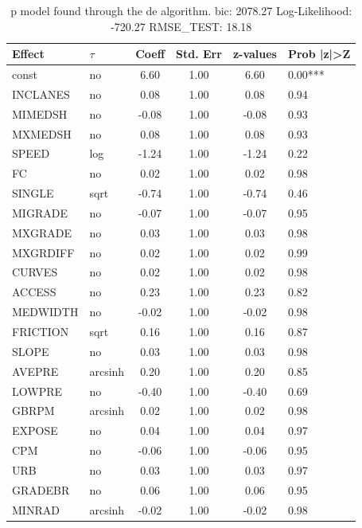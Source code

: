 \begin{table}
	\caption{p model found through the de algorithm. bic: 2078.27 Log-Likelihood: -720.27 RMSE_TEST: 18.18}
	\begin{center}
		\begin{tabular}{|l|l|c|c|c|l|}
			\hline
			Effect & $\tau$ & Coeff & Std. Err & z-values & Prob |z|>Z \\
			\hline
			const & no & 6.60 & 1.00 & 6.60 & 0.00*** \\
			\hline
			INCLANES & no & 0.08 & 1.00 & 0.08 & 0.94 \\
			\hline
			MIMEDSH & no & -0.08 & 1.00 & -0.08 & 0.93 \\
			\hline
			MXMEDSH & no & 0.08 & 1.00 & 0.08 & 0.93 \\
			\hline
			SPEED & log & -1.24 & 1.00 & -1.24 & 0.22 \\
			\hline
			FC & no & 0.02 & 1.00 & 0.02 & 0.98 \\
			\hline
			SINGLE & sqrt & -0.74 & 1.00 & -0.74 & 0.46 \\
			\hline
			MIGRADE & no & -0.07 & 1.00 & -0.07 & 0.95 \\
			\hline
			MXGRADE & no & 0.03 & 1.00 & 0.03 & 0.98 \\
			\hline
			MXGRDIFF & no & 0.02 & 1.00 & 0.02 & 0.99 \\
			\hline
			CURVES & no & 0.02 & 1.00 & 0.02 & 0.98 \\
			\hline
			ACCESS & no & 0.23 & 1.00 & 0.23 & 0.82 \\
			\hline
			MEDWIDTH & no & -0.02 & 1.00 & -0.02 & 0.98 \\
			\hline
			FRICTION & sqrt & 0.16 & 1.00 & 0.16 & 0.87 \\
			\hline
			SLOPE & no & 0.03 & 1.00 & 0.03 & 0.98 \\
			\hline
			AVEPRE & arcsinh & 0.20 & 1.00 & 0.20 & 0.85 \\
			\hline
			LOWPRE & no & -0.40 & 1.00 & -0.40 & 0.69 \\
			\hline
			GBRPM & arcsinh & 0.02 & 1.00 & 0.02 & 0.98 \\
			\hline
			EXPOSE & no & 0.04 & 1.00 & 0.04 & 0.97 \\
			\hline
			CPM & no & -0.06 & 1.00 & -0.06 & 0.95 \\
			\hline
			URB & no & 0.03 & 1.00 & 0.03 & 0.97 \\
			\hline
			GRADEBR & no & 0.06 & 1.00 & 0.06 & 0.95 \\
			\hline
			MINRAD & arcsinh & -0.02 & 1.00 & -0.02 & 0.98 \\

\end{tabular}
\end{center}
\end{table}
